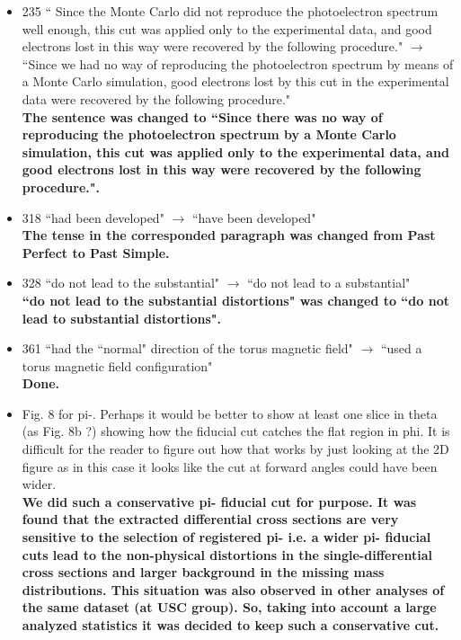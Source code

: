 \documentclass[,superscriptaddress,showpacs,amssymb,amsmath,amsfonts,linenumbers,article]{revtex4-1}
\begin{document}
\begin{itemize}
\item 235 `` Since the Monte Carlo did not reproduce the photoelectron spectrum well enough, this cut
was applied only to the experimental data, and good electrons lost in this way were recovered by
the following procedure." $\rightarrow$ ``Since we had no way of reproducing the photoelectron spectrum by
means of a Monte Carlo simulation, good electrons lost by this cut in the experimental data were
recovered by the following procedure."\\
{\bf The sentence was changed to ``Since there was no way  of reproducing the photoelectron spectrum by a Monte Carlo simulation, this cut was applied only to the experimental data, and good electrons lost in this way were recovered by the following procedure.".}

\item 318 ``had been developed" $\rightarrow$ ``have been developed"\\
{\bf The tense in the corresponded paragraph was changed from Past Perfect to Past Simple.}

\item 328 ``do not lead to the substantial" $\rightarrow$ ``do not lead to a substantial"\\
{\bf ``do not lead to the substantial distortions" was changed to ``do not lead to substantial distortions".}

\item 361 ``had the ``normal" direction of the torus magnetic field" $\rightarrow$  ``used a torus magnetic field
configuration"\\
{\bf Done.}

\item  Fig. 8 for pi-. Perhaps it would be better to show at least one slice in theta (as Fig. 8b ?) showing
how the fiducial cut catches the flat region in phi. It is difficult for the reader to figure out how that
works by just looking at the 2D figure as in this case it looks like the cut at forward angles could have
been wider.\\
{\bf We did such a conservative pi- fiducial cut for purpose. It was found that the extracted differential cross sections are very sensitive to the selection of registered pi- i.e. a wider pi- fiducial cuts lead to the non-physical distortions in the single-differential cross sections and larger background in the missing mass distributions. This situation was also observed in other analyses of the same dataset (at USC group). So, taking into account a large analyzed statistics it was decided to keep such a conservative cut.}


\end{itemize}
\end{document}
